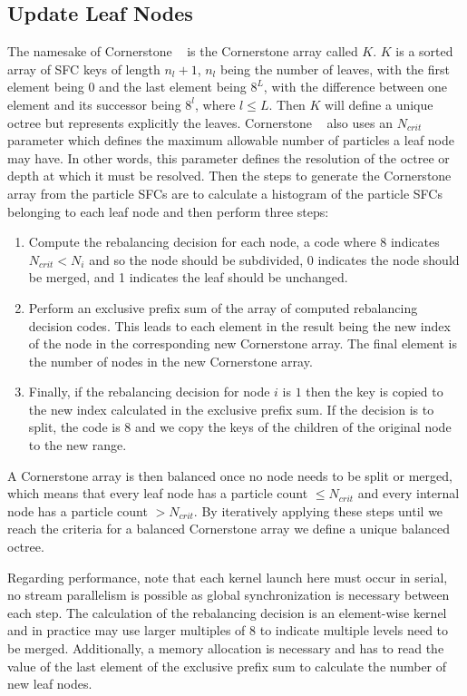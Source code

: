 \subsection{Update Leaf Nodes}
The namesake of Cornerstone ~\cite{cornerstone} is the Cornerstone array called $K$. $K$ is a sorted array of SFC keys of length $n_l+1$, $n_l$ being the number of leaves, with the first element being $0$ and the last element being $8^L$, with the difference between one element and its successor being $8^l$, where $l \le L$. Then $K$ will define a unique octree but represents explicitly the leaves. Cornerstone ~\cite{cornerstone} also uses an $N_{crit}$ parameter which defines the maximum allowable number of particles a leaf node may have. In other words, this parameter defines the resolution of the octree or depth at which it must be resolved. Then the steps to generate the Cornerstone array from the particle SFCs are to calculate a histogram of the particle SFCs belonging to each leaf node and then perform three steps:
\begin{enumerate}
    \item Compute the rebalancing decision for each node, a code where 8 indicates $N_{crit} < N_i$ and so the node should be subdivided, 0 indicates the node should be merged, and 1 indicates the leaf should be unchanged.
    \item Perform an exclusive prefix sum of the array of computed rebalancing decision codes. This leads to each element in the result being the new index of the node in the corresponding new Cornerstone array. The final element is the number of nodes in the new Cornerstone array.
    \item Finally, if the rebalancing decision for node $i$ is $1$ then the key is copied to the new index calculated in the exclusive prefix sum. If the decision is to split, the code is $8$ and we copy the keys of the children of the original node to the new range.
\end{enumerate}
A Cornerstone array is then balanced once no node needs to be split or merged, which means that every leaf node has a particle count $\le N_{crit}$ and every internal node has a particle count $> N_{crit}$. By iteratively applying these steps until we reach the criteria for a balanced Cornerstone array we define a unique balanced octree. 

Regarding performance, note that each kernel launch here must occur in serial, no stream parallelism is possible as global synchronization is necessary between each step. The calculation of the rebalancing decision is an element-wise kernel and in practice may use larger multiples of $8$ to indicate multiple levels need to be merged. Additionally, a memory allocation is necessary and has to read the value of the last element of the exclusive prefix sum to calculate the number of new leaf nodes. 

